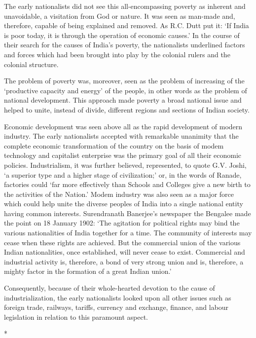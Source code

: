 The early nationalists did not see this all-encompassing poverty as inherent and unavoidable, a visitation from God or nature. It was seen as man-made and, therefore, capable of being explained and removed. As R.C. Dutt put it: `If India is poor today, it is through the operation of economic causes.' In the course of their search for the causes of India's poverty, the nationalists underlined factors and forces which had been brought into play by the colonial rulers and the colonial structure.

The problem of poverty was, moreover, seen as the problem of increasing of the `productive capacity and energy' of the people, in other words as the problem of national development. This approach made poverty a broad national issue and helped to unite, instead of divide, different regions and sections of Indian society.

Economic development was seen above all as the rapid development of modern industry. The early nationalists accepted with remarkable unanimity that the complete economic transformation of the country on the basis of modem technology and capitalist enterprise was the primary goal of all their economic policies. Industrialism, it was further believed, represented, to quote G.V. Joshi, `a superior type and a higher stage of civilization;' or, in the words of Ranade, factories could `far more effectively than Schools and Colleges give a new birth to the activities of the Nation.' Modem industry was also seen as a major force which could help unite the diverse peoples of India into a single national entity having common interests. Surendranath Banerjee's newspaper the Bengalee made the point on 18 January 1902: `The agitation for political rights may bind the various nationalities of India together for a time. The community of interests may cease when these rights are achieved. But the commercial union of the various Indian nationalities, once established, will never cease to exist. Commercial and industrial activity is, therefore, a bond of very strong union and is, therefore, a mighty factor in the formation of a great Indian union.'

Consequently, because of their whole-hearted devotion to the cause of industrialization, the early nationalists looked upon all other issues such as foreign trade, railways, tariffs, currency and exchange, finance, and labour legislation in relation to this paramount aspect.

\begin{center}*\end{center}

